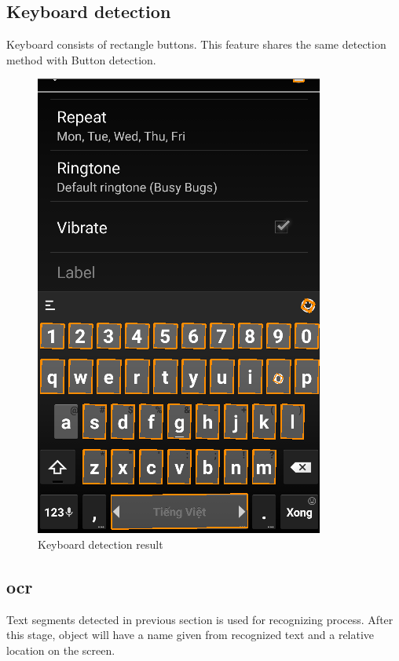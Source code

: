 \subsection{Keyboard detection}
Keyboard consists of rectangle buttons. This feature shares the same detection method with Button detection.

	\begin{figure}[H]
		\centering
		\includegraphics[scale=0.5]{Chapters/Fig/kb_detect.png}
		\caption{Keyboard detection result}
		\label{fig:kb_detect}
	\end{figure}

\subsection{\acrlong{ocr}}
Text segments detected in previous section is used for recognizing process. After this stage, object will have a name given from recognized text and a relative location on the screen.

